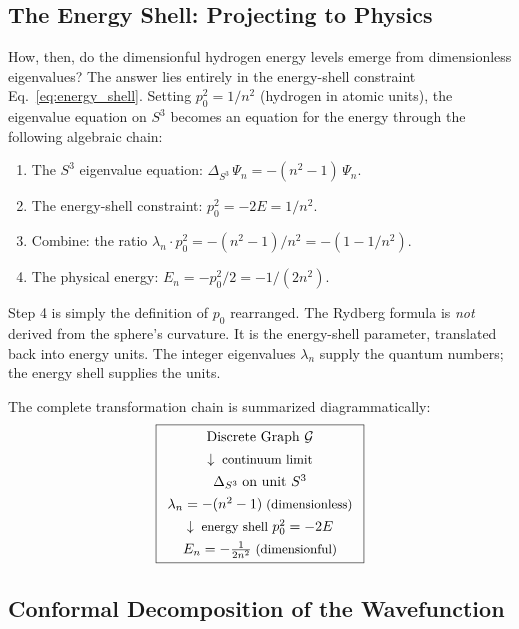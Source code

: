 \documentclass[aps,pra,twocolumn,superscriptaddress,longbibliography]{revtex4-2}
\begin{document}
\subsection{The Energy Shell: Projecting to Physics}

How, then, do the dimensionful hydrogen energy levels emerge from dimensionless eigenvalues? The answer lies entirely in the energy-shell constraint Eq.~\eqref{eq:energy_shell}. Setting $p_0^2 = 1/n^2$ (hydrogen in atomic units), the eigenvalue equation on $S^3$ becomes an equation for the energy through the following algebraic chain:

\begin{enumerate}
\item The $S^3$ eigenvalue equation: $\Delta_{S^3}\,\Psi_n = -(n^2 - 1)\,\Psi_n$.
\item The energy-shell constraint: $p_0^2 = -2E = 1/n^2$.
\item Combine: the ratio $\lambda_n \cdot p_0^2 = -(n^2 - 1)/n^2 = -(1 - 1/n^2)$.
\item The physical energy: $E_n = -p_0^2/2 = -1/(2n^2)$.
\end{enumerate}

Step 4 is simply the definition of $p_0$ rearranged. The Rydberg formula is \textit{not} derived from the sphere's curvature. It is the energy-shell parameter, translated back into energy units. The integer eigenvalues $\lambda_n$ supply the quantum numbers; the energy shell supplies the units.

The complete transformation chain is summarized diagrammatically:
\begin{equation}
\boxed{
\begin{array}{c}
\text{Discrete Graph } \mathcal{G} \\[4pt]
\downarrow \;\text{\small continuum limit}\\[4pt]
\Delta_{S^3} \;\text{on unit } S^3 \\[4pt]
\lambda_n = -(n^2 - 1) \;\text{\small (dimensionless)}\\[4pt]
\downarrow \;\text{\small energy shell } p_0^2 = -2E\\[4pt]
E_n = -\frac{1}{2n^2} \;\text{\small (dimensionful)}
\end{array}
}
\label{eq:chain}
\end{equation}

\subsection{Conformal Decomposition of the Wavefunction}
\end{document}
